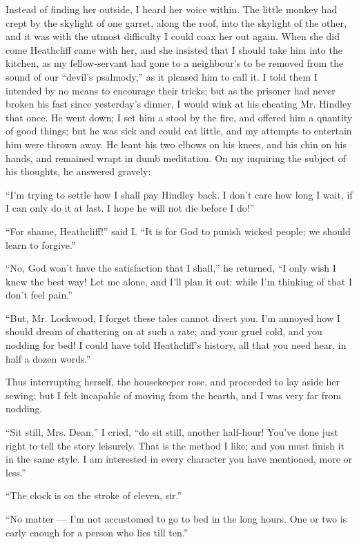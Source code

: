\par Instead of finding her outside, I heard her voice within. The little monkey had crept by the skylight of one garret, along the roof, into the skylight of the other, and it was with the utmost difficulty I could coax her out again. When she did come Heathcliff came with her, and she insisted that I should take him into the kitchen, as my fellow-servant had gone to a neighbour's to be removed from the sound of our “devil's psalmody,” as it pleased him to call it. I told them I intended by no means to encourage their tricks; but as the prisoner had never broken his fast since yesterday's dinner, I would wink at his cheating Mr. Hindley that once. He went down; I set him a stool by the fire, and offered him a quantity of good things; but he was sick and could eat little, and my attempts to entertain him were thrown away. He leant his two elbows on his knees, and his chin on his hands, and remained wrapt in dumb meditation. On my inquiring the subject of his thoughts, he answered gravely:
\par “I'm trying to settle how I shall pay Hindley back. I don't care how long I wait, if I can only do it at last. I hope he will not die before I do!”
\par “For shame, Heathcliff!” said I. “It is for God to punish wicked people; we should learn to forgive.”
\par “No, God won't have the satisfaction that I shall,” he returned, “I only wish I knew the best way! Let me alone, and I'll plan it out: while I'm thinking of that I don't feel pain.”
\par “But, Mr. Lockwood, I forget these tales cannot divert you. I'm annoyed how I should dream of chattering on at such a rate; and your gruel cold, and you nodding for bed! I could have told Heathcliff's history, all that you need hear, in half a dozen words.”
\par Thus interrupting herself, the housekeeper rose, and proceeded to lay aside her sewing; but I felt incapable of moving from the hearth, and I was very far from nodding.
\par “Sit still, Mrs. Dean,” I cried, “do sit still, another half-hour! You've done just right to tell the story leisurely. That is the method I like; and you must finish it in the same style. I am interested in every character you have mentioned, more or less.”
\par “The clock is on the stroke of eleven, sir.”
\par “No matter — I'm not accustomed to go to bed in the long hours. One or two is early enough for a person who lies till ten.”
